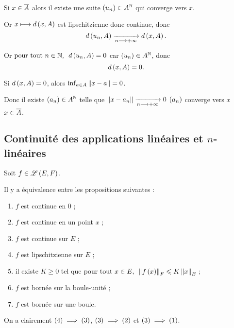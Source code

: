 \begin{dem}[\(x\in\conj{A}\ssi d\paren{x,A}=0\)]
\impdir

Si \(x\in\overline{A}\) alors il existe une suite \(\left(u_n\right)\in A^{\mathbb{N}}\) qui converge vers \(x\).

Or \(x\longmapsto d\left(x,A\right)\) est lipschitzienne donc continue, donc \[d\left(u_n,A\right)\xrightarrow[n\longrightarrow+\infty]{}d\left(x,A\right).\]

Or \(\quantifs{\tpt n\in\N}d\paren{u_n,A}=0\) car \(\left(u_n\right)\in A^{\mathbb{N}}\), donc \[d\left(x,A\right)=0.\]

\imprec

Si \(d\left(x,A\right)=0\), alors \(\inf_{a\in A}\norme{x-a}=0\).

Donc il existe \(\left(a_n\right)\in A^{\mathbb{N}}\) telle que \(\norme{x-a_n}\tendqd{n\to\pinf}0\) \ie \(\left(a_n\right)\) converge vers \(x\) \ie \(x\in\overline{A}\).
\end{dem}

\subsection{Continuité des applications linéaires et \(n\)-linéaires}

\begin{prop}
Soit \(f\in\mathscr{L}\left(E,F\right)\).

Il y a équivalence entre les propositions suivantes :

\begin{enumerate}
    \item \(f\) est continue en \(0\) ; \\
    \item \(f\) est continue en un point \(x\) ; \\
    \item \(f\) est continue sur \(E\) ; \\
    \item \(f\) est lipschitzienne sur \(E\) ; \\
    \item il existe \(K\geq 0\) tel que \(\quantifs{\tpt x\in E}\norme{f\paren{x}}_F\leq K\norme{x}_E\) ; \\
    \item \(f\) est bornée sur la boule-unité ; \\
    \item \(f\) est bornée sur une boule.
\end{enumerate}
\end{prop}

\begin{dem}
On a clairement \(\left(4\right)\implies\left(3\right)\), \(\left(3\right)\implies\left(2\right)\) et \(\left(3\right)\implies\left(1\right)\).
\end{dem}

